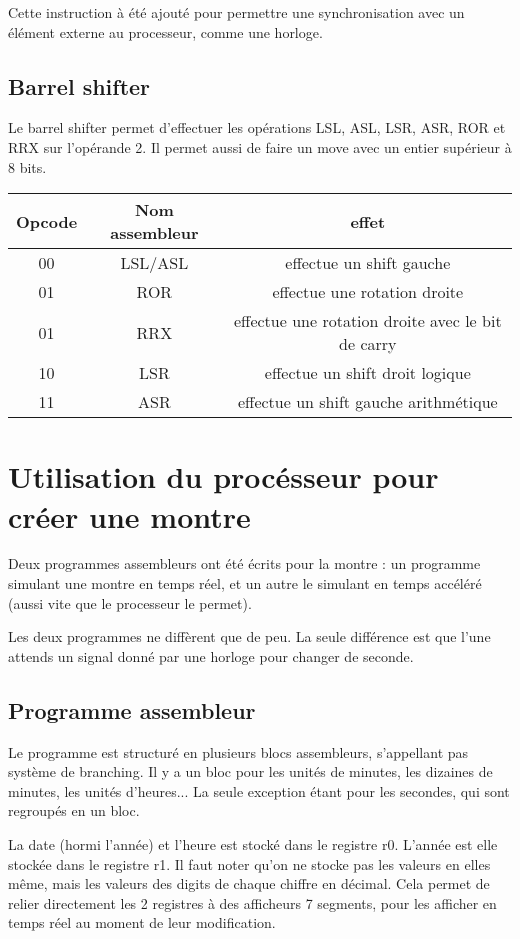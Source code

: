 \documentclass[a4paper]{article}
\begin{document}
Cette instruction à été ajouté pour permettre une synchronisation avec un
élément externe au processeur, comme une horloge.

\subsection{Barrel shifter}

Le barrel shifter permet d'effectuer les opérations LSL, ASL, LSR, ASR, ROR et
RRX sur l'opérande 2. Il permet aussi de faire un move avec un entier supérieur
à 8 bits.

\begin{tabular}{|c|c|c|}
  \hline
  Opcode & Nom assembleur & effet \\
  \hline
  00 & LSL/ASL & effectue un shift gauche\\
  01 & ROR & effectue une rotation droite\\
  01 & RRX & effectue une rotation droite avec le bit de carry\\
  10 & LSR & effectue un shift droit logique\\
  11 & ASR & effectue un shift gauche arithmétique\\
  \hline
\end{tabular}

\section{Utilisation du procésseur pour créer une montre}

Deux programmes assembleurs ont été écrits pour la montre : un programme
simulant une montre en temps réel, et un autre le simulant en temps accéléré
(aussi vite que le processeur le permet).

Les deux programmes ne diffèrent que de peu. La seule différence est que l'une
attends un signal donné par une horloge pour changer de seconde.

\subsection{Programme assembleur}


Le programme est structuré en plusieurs blocs assembleurs, s'appellant pas
système de branching. Il y a un bloc pour les unités de minutes, les dizaines de
minutes, les unités d'heures... La seule exception étant pour les secondes, qui
sont regroupés en un bloc.

La date (hormi l'année) et l'heure est stocké dans le registre r0. L'année est
elle stockée dans le registre r1. Il faut noter qu'on ne stocke pas les valeurs
en elles même, mais les valeurs des digits de chaque chiffre en décimal. Cela
permet de relier directement les 2 registres à des afficheurs 7 segments, pour
les afficher en temps réel au moment de leur modification.
\end{document}
